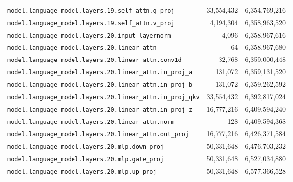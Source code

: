 \documentclass[10pt,a4paper]{article}
\theoremstyle{definition}
\begin{document}
\begin{appendices}
\begin{longtable}{p{9.5cm}rr}
\texttt{model.\allowbreak{}language\_model.\allowbreak{}layers.\allowbreak{}19.\allowbreak{}self\_attn.\allowbreak{}q\_proj} & 33,554,432 & 6,354,769,216 \\
\texttt{model.\allowbreak{}language\_model.\allowbreak{}layers.\allowbreak{}19.\allowbreak{}self\_attn.\allowbreak{}v\_proj} & 4,194,304 & 6,358,963,520 \\
\texttt{model.\allowbreak{}language\_model.\allowbreak{}layers.\allowbreak{}20.\allowbreak{}input\_layernorm} & 4,096 & 6,358,967,616 \\
\texttt{model.\allowbreak{}language\_model.\allowbreak{}layers.\allowbreak{}20.\allowbreak{}linear\_attn} & 64 & 6,358,967,680 \\
\texttt{model.\allowbreak{}language\_model.\allowbreak{}layers.\allowbreak{}20.\allowbreak{}linear\_attn.\allowbreak{}conv1d} & 32,768 & 6,359,000,448 \\
\texttt{model.\allowbreak{}language\_model.\allowbreak{}layers.\allowbreak{}20.\allowbreak{}linear\_attn.\allowbreak{}in\_proj\_a} & 131,072 & 6,359,131,520 \\
\texttt{model.\allowbreak{}language\_model.\allowbreak{}layers.\allowbreak{}20.\allowbreak{}linear\_attn.\allowbreak{}in\_proj\_b} & 131,072 & 6,359,262,592 \\
\texttt{model.\allowbreak{}language\_model.\allowbreak{}layers.\allowbreak{}20.\allowbreak{}linear\_attn.\allowbreak{}in\_proj\_qkv} & 33,554,432 & 6,392,817,024 \\
\texttt{model.\allowbreak{}language\_model.\allowbreak{}layers.\allowbreak{}20.\allowbreak{}linear\_attn.\allowbreak{}in\_proj\_z} & 16,777,216 & 6,409,594,240 \\
\texttt{model.\allowbreak{}language\_model.\allowbreak{}layers.\allowbreak{}20.\allowbreak{}linear\_attn.\allowbreak{}norm} & 128 & 6,409,594,368 \\
\texttt{model.\allowbreak{}language\_model.\allowbreak{}layers.\allowbreak{}20.\allowbreak{}linear\_attn.\allowbreak{}out\_proj} & 16,777,216 & 6,426,371,584 \\
\texttt{model.\allowbreak{}language\_model.\allowbreak{}layers.\allowbreak{}20.\allowbreak{}mlp.\allowbreak{}down\_proj} & 50,331,648 & 6,476,703,232 \\
\texttt{model.\allowbreak{}language\_model.\allowbreak{}layers.\allowbreak{}20.\allowbreak{}mlp.\allowbreak{}gate\_proj} & 50,331,648 & 6,527,034,880 \\
\texttt{model.\allowbreak{}language\_model.\allowbreak{}layers.\allowbreak{}20.\allowbreak{}mlp.\allowbreak{}up\_proj} & 50,331,648 & 6,577,366,528 \\

\end{longtable}
\end{appendices}
\end{document}
